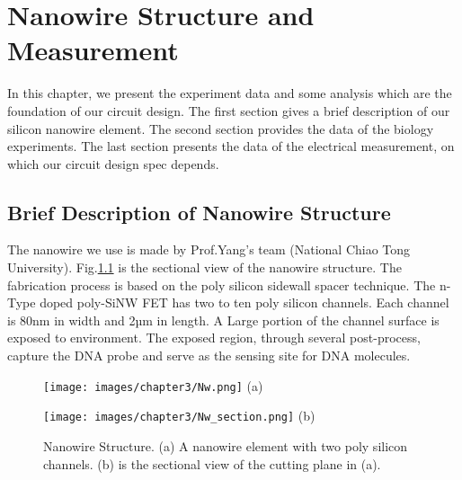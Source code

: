 \chapter{Nanowire Structure and Measurement}
In this chapter, we present the experiment data and some analysis which are the foundation of our circuit design.
The first section gives a brief description of our silicon nanowire element.
The second section provides the data of the biology experiments.
The last section presents the data of the electrical measurement, on which our circuit design spec depends.

\section{Brief Description of Nanowire Structure}
The nanowire we use is made by Prof.Yang's team (National Chiao Tong University)\cite{C5}.
Fig.\ref{fig:drawing} is the sectional view of the nanowire structure.
The fabrication process is based on the poly silicon sidewall spacer technique.
The n-Type doped poly-SiNW FET has two to ten poly silicon channels.
Each channel is 80nm in width and 2µm in length.
A Large portion of the channel surface is exposed to environment.
The exposed region, through several post-process, capture the DNA probe and serve as the sensing site for DNA molecules.\cite{C5, C6}


\begin{figure}[!htbp]
    \centering
    \begin{minipage}[t]{0.4\textwidth}
        \texttt{[image: images/chapter3/Nw.png]}
        \raggedleft
        (a)
    \end{minipage}
    \vfill
    \vfill
    \begin{minipage}[t]{0.4\textwidth}
        \texttt{[image: images/chapter3/Nw\_section.png]}
        \raggedleft
        (b)
    \end{minipage}
    \caption{Nanowire Structure.  (a) A nanowire element with two poly silicon channels. (b) is the sectional view of the cutting plane in (a). }
    \label{fig:drawing}
\end{figure}


